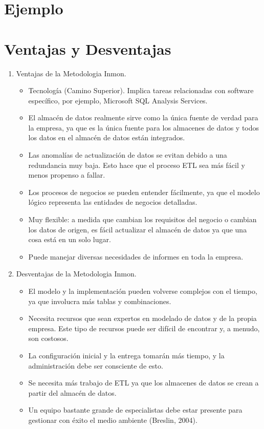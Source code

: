 \documentclass[preprint,12pt]{elsarticle}
\begin{document}
\section{Ejemplo}
 
\section{Ventajas y Desventajas}
\begin{enumerate}[5.1]
    \item Ventajas de la Metodologia Inmon.
 \\
\begin{itemize}
\item Tecnología (Camino Superior). Implica tareas relacionadas con software específico, por ejemplo, Microsoft SQL Analysis Services.
\item El almacén de datos realmente sirve como la única fuente de verdad para la empresa, ya que es la única fuente para los almacenes de datos y todos los datos en el almacén de datos están integrados.
\item Las anomalías de actualización de datos se evitan debido a una redundancia muy baja. Esto hace que el proceso ETL sea más fácil y menos propenso a fallar.
\item Los procesos de negocios se pueden entender fácilmente, ya que el modelo lógico representa las entidades de negocios detalladas.
\item Muy flexible: a medida que cambian los requisitos del negocio o cambian los datos de origen, es fácil actualizar el almacén de datos ya que una cosa está en un solo lugar.
\item Puede manejar diversas necesidades de informes en toda la empresa.
\\
\end{itemize}
 \item Desventajas de la Metodologia Inmon.
\begin{itemize}

\item El modelo y la implementación pueden volverse complejos con el tiempo, ya que involucra más tablas y combinaciones.
\item Necesita recursos que sean expertos en modelado de datos y de la propia empresa. Este tipo de recursos puede ser difícil de encontrar y, a menudo, son costosos.
\item La configuración inicial y la entrega tomarán más tiempo, y la administración debe ser consciente de esto.
\item Se necesita más trabajo de ETL ya que los almacenes de datos se crean a partir del almacén de datos.
\item Un equipo bastante grande de especialistas debe estar presente para gestionar con éxito el medio ambiente (Breslin, 2004).
\end{itemize}


\end{enumerate}
\end{document}
